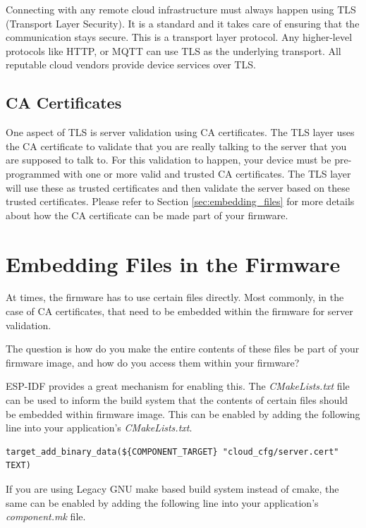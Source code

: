 \documentclass[main.tex]{subfiles}
\begin{document}
Connecting with any remote cloud infrastructure must always happen using TLS (Transport Layer Security). It is a standard and it takes care of ensuring that the communication stays secure. This is a transport layer protocol. Any higher-level protocols like HTTP, or MQTT can use TLS as the underlying transport. All reputable cloud vendors provide device services over TLS.

\subsection{CA Certificates}
One aspect of TLS is server validation using CA certificates. The TLS layer uses the CA certificate to validate that you are really talking to the server that you are supposed to talk to. For this validation to happen, your device must be pre-programmed with one or more valid and trusted CA certificates. The TLS layer will use these as trusted certificates and then validate the server based on these trusted certificates. Please refer to Section \ref{sec:embedding_files} for more details about how the CA certificate can be made part of your firmware.

\section{Embedding Files in the Firmware}\label{sec:embedding_files}
At times, the firmware has to use certain files directly. Most commonly, in the case of CA certificates, that need to be embedded within the firmware for server validation.

The question is how do you make the entire contents of these files be part of your firmware image, and how do you access them within your firmware?


ESP-IDF provides a great mechanism for enabling this. The \textit{CMakeLists.txt} file can be used to inform the build system that the contents of certain files should be embedded within firmware image. This can be enabled by adding the following line into your application's \textit{CMakeLists.txt}.

\begin{verbatim}
target_add_binary_data(${COMPONENT_TARGET} "cloud_cfg/server.cert" TEXT)
\end{verbatim}


If you are using Legacy GNU make based build system instead of cmake, the same can be enabled by adding the following line into your application's \textit{component.mk} file.
\end{document}
